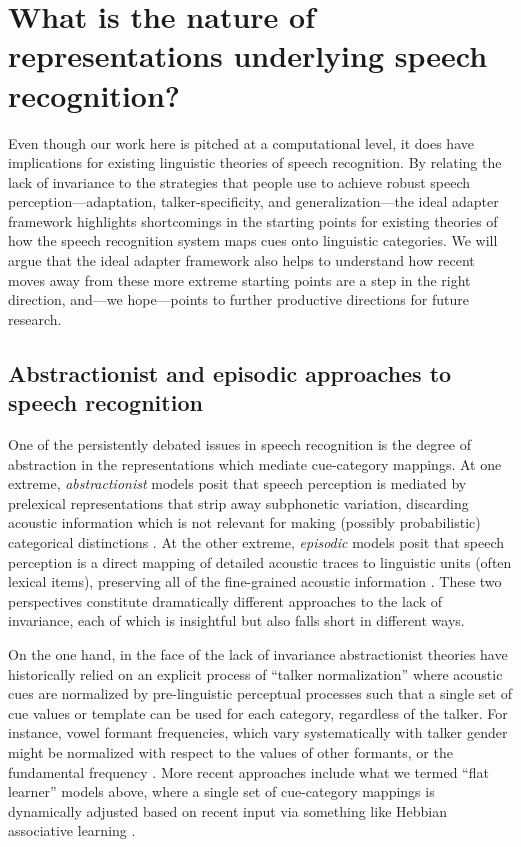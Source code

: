 \label{r2-part3-sec-end}

\section{What is the nature of representations underlying speech recognition?}
\label{sec:ling-theor-speech}
\label{r3-epi-abs}
\label{r1-epi-abs}

Even though our work here is pitched at a computational level, it does have implications for existing linguistic theories of speech recognition.  By relating the lack of invariance to the strategies that people use to achieve robust speech perception---adaptation, talker-specificity, and generalization---the ideal adapter framework highlights shortcomings in the starting points for existing theories of how the speech recognition system maps cues onto linguistic categories.  We will argue that the ideal adapter framework also helps to understand how recent moves away from these more extreme starting points are a step in the right direction, and---we hope---points to further productive directions for future research.


\subsection{Abstractionist and episodic approaches to speech recognition}
\label{sec:abstr-epis-theor}

One of the persistently debated issues in speech recognition is the degree of abstraction in the representations which mediate cue-category mappings.  At one extreme, \emph{abstractionist} models posit that speech perception is mediated by prelexical representations that strip away subphonetic variation, discarding acoustic information which is not relevant for making (possibly probabilistic) categorical distinctions \autocite{McClelland1986,Norris1994,Norris2000,Norris2008}.  At the other extreme, \emph{episodic} models posit that speech perception is a direct mapping of detailed acoustic traces to linguistic units (often lexical items), preserving all of the fine-grained acoustic information \autocite{Goldinger1998,Johnson1997a,Johnson2006,Pierrehumbert2002}.  These two perspectives constitute dramatically different approaches to the lack of invariance, each of which is insightful but also falls short in different ways.

On the one hand, in the face of the lack of invariance abstractionist theories have historically relied on an explicit process of ``talker normalization'' where acoustic cues are normalized by pre-linguistic perceptual processes such that a single set of cue values or template can be used for each category, regardless of the talker.  For instance, vowel formant frequencies, which vary systematically with talker gender \autocite{Hillenbrand1995,Peterson1952} might be normalized with respect to the values of other formants, or the fundamental frequency \autocite{Strange1989}.  More recent approaches include what we termed ``flat learner'' models above, where a single set of cue-category mappings is dynamically adjusted based on recent input via something like Hebbian associative learning \autocite{Lancia2013,Mirman2006}.

